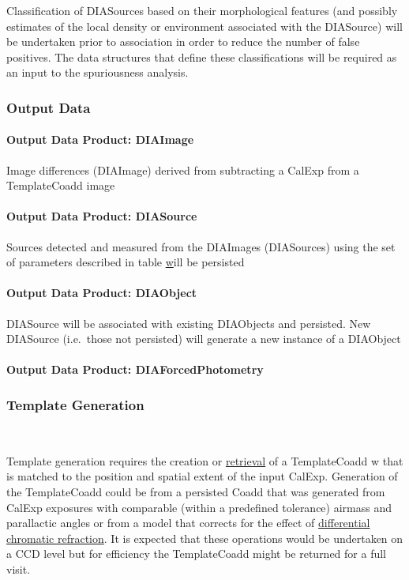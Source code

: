 Classification of DIASources based on their morphological features (and possibly estimates of the local density or  environment associated with the DIASource) will be undertaken prior to association in order to reduce the number of false positives. The data structures that define these classifications will be required as an input to the spuriousness analysis. 

\subsubsection{Output Data}

\paragraph{Output Data Product: DIAImage}

Image differences (DIAImage) derived from subtracting a CalExp from a TemplateCoadd image 

\paragraph{Output Data Product: DIASource}

Sources detected and measured from the DIAImages (DIASources) using the set of parameters described in table \hyperref[table:ap_features] will be persisted


\paragraph{Output Data Product: DIAObject}

DIASource will be associated with existing DIAObjects and persisted. New DIASource (i.e.\ those not persisted) will generate a new instance of a DIAObject 

\paragraph{Output Data Product: DIAForcedPhotometry}




\subsubsection{Template Generation}~
\label{sec:apCRTemplates}

Template generation requires the creation or \hyperref[sec:acRetrieveTemplate]{retrieval} of a TemplateCoadd w that is matched to the position and spatial extent of the input CalExp. Generation of the TemplateCoadd could be from a persisted Coadd that was generated from CalExp exposures with comparable (within a predefined tolerance) airmass and parallactic angles or from a model that corrects for the effect of  \hyperref[sec:acDCRTemplates]{differential chromatic refraction}. It is expected that these operations would be undertaken on a CCD level but for efficiency the TemplateCoadd might be returned for a full visit. 


